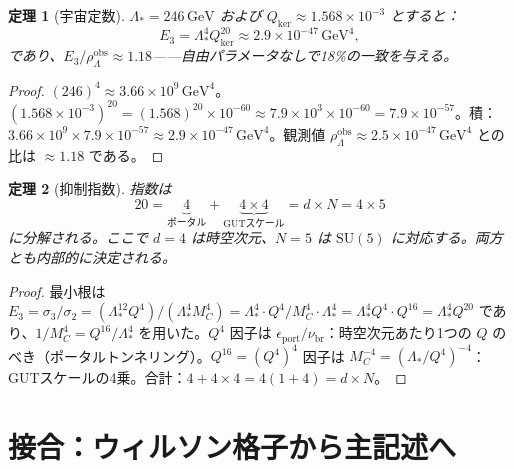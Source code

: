 \documentclass[12pt]{article}
\theoremstyle{plain}
\newtheorem{theorem}{定理}[section]
\theoremstyle{definition}
\numberwithin{equation}{section}
\newcommand{\br}{\mathrm{br}}
\newcommand{\kker}{\mathrm{ker}}
\begin{document}
\begin{theorem}[宇宙定数]\label{thm:cosmoconst}
$\Lambda_*=246\,\mathrm{GeV}$ および $Q_{\kker}\approx 1.568\times 10^{-3}$ とすると：
\begin{equation}
E_3=\Lambda_*^4 Q_{\kker}^{20}\approx 2.9\times 10^{-47}\,\mathrm{GeV}^4,
\end{equation}
であり、$E_3/\rho_\Lambda^{\mathrm{obs}}\approx 1.18$——自由パラメータなしで18\%の一致を与える。
\end{theorem}

\begin{proof}
$(246)^4\approx 3.66\times 10^9\,\mathrm{GeV}^4$。$(1.568\times 10^{-3})^{20}=(1.568)^{20}\times 10^{-60}\approx 7.9\times 10^3\times 10^{-60}=7.9\times 10^{-57}$。積：$3.66\times 10^9\times 7.9\times 10^{-57}\approx 2.9\times 10^{-47}\,\mathrm{GeV}^4$。観測値 $\rho_\Lambda^{\mathrm{obs}}\approx 2.5\times 10^{-47}\,\mathrm{GeV}^4$ との比は $\approx 1.18$ である。
\end{proof}

\begin{theorem}[抑制指数]\label{thm:exponent}
指数は
\begin{equation}
20 = \underbrace{4}_{\text{ポータル}} + \underbrace{4\times 4}_{\text{GUTスケール}} = d\times N = 4\times 5
\end{equation}
に分解される。ここで $d=4$ は時空次元、$N=5$ は $\mathrm{SU}(5)$ に対応する。両方とも内部的に決定される。
\end{theorem}

\begin{proof}
最小根は $E_3=\sigma_3/\sigma_2=(\Lambda_*^{12}Q^4)/(\Lambda_*^4 M_C^4)=\Lambda_*^4\cdot Q^4/M_C^4\cdot\Lambda_*^4=\Lambda_*^4 Q^4\cdot Q^{16}=\Lambda_*^4 Q^{20}$ であり、$1/M_C^4=Q^{16}/\Lambda_*^4$ を用いた。$Q^4$ 因子は $\epsilon_{\mathrm{port}}/\nu_{\br}$：時空次元あたり1つの $Q$ のべき（ポータルトンネリング）。$Q^{16}=(Q^4)^4$ 因子は $M_C^{-4}=(\Lambda_*/Q^4)^{-4}$：GUTスケールの4乗。合計：$4+4\times 4=4(1+4)=d\times N$。
\end{proof}



\part{接合：ウィルソン格子から主記述へ}
\end{document}
